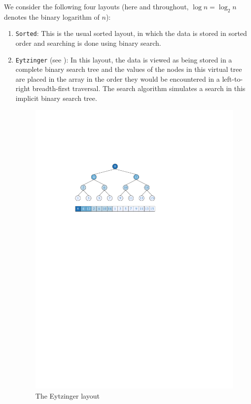 \documentclass{patmorin}
\begin{document}
We consider the following four layouts (here and throughout, $\log
n=\log_2 n$ denotes the binary logarithm of $n$):

\begin{enumerate}
  \item \texttt{Sorted}:  This is the usual sorted layout, in which
  the data is stored in sorted order and searching is done using binary
  search.

  \item \texttt{Eytzinger} (see ): In this layout,
  the data is viewed as being stored in a complete binary search tree and
  the values of the nodes in this virtual tree are placed in the array in
  the order they would be encountered in a left-to-right breadth-first
  traversal.  The search algorithm simulates a search in this implicit
  binary search tree.

  \begin{figure}
    \begin{center}\includegraphics{eytzinger}\end{center}
    \caption{The Eytzinger layout}
  \end{figure}


\end{enumerate}
\end{document}
